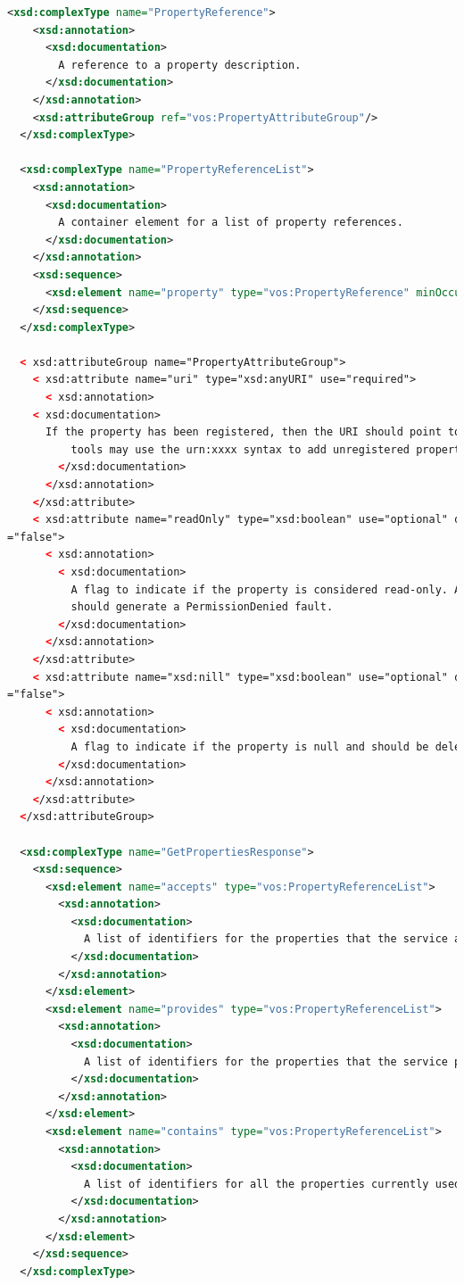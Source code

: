 \documentclass[11pt,a4paper]{ivoa}
\begin{document}
\begin{lstlisting}[language=xml, basicstyle=\scriptsize]
  <xsd:complexType name="PropertyReference">
    <xsd:annotation>
      <xsd:documentation>
        A reference to a property description.
      </xsd:documentation>
    </xsd:annotation>
    <xsd:attributeGroup ref="vos:PropertyAttributeGroup"/>
  </xsd:complexType>

  <xsd:complexType name="PropertyReferenceList">
    <xsd:annotation>
      <xsd:documentation>
        A container element for a list of property references.
      </xsd:documentation>
    </xsd:annotation>
    <xsd:sequence>
      <xsd:element name="property" type="vos:PropertyReference" minOccurs="0" maxOccurs="unbounded" nillable="true"/>
    </xsd:sequence>
  </xsd:complexType>

  < xsd:attributeGroup name="PropertyAttributeGroup">
    < xsd:attribute name="uri" type="xsd:anyURI" use="required">
      < xsd:annotation>
	< xsd:documentation>                    
	  If the property has been registered, then the URI should point to the registration document. Third party 
          tools may use the urn:xxxx syntax to add unregistered properties.
        </xsd:documentation>
      </xsd:annotation>
    </xsd:attribute>
    < xsd:attribute name="readOnly" type="xsd:boolean" use="optional" default
="false">
      < xsd:annotation>
        < xsd:documentation>
          A flag to indicate if the property is considered read-only. Attempting to modify a read-only property
          should generate a PermissionDenied fault.
        </xsd:documentation>
      </xsd:annotation>
    </xsd:attribute>
    < xsd:attribute name="xsd:nill" type="xsd:boolean" use="optional" default
="false">
      < xsd:annotation>
        < xsd:documentation>
          A flag to indicate if the property is null and should be deleted.
        </xsd:documentation>
      </xsd:annotation>
    </xsd:attribute>
  </xsd:attributeGroup>

  <xsd:complexType name="GetPropertiesResponse">
    <xsd:sequence>
      <xsd:element name="accepts" type="vos:PropertyReferenceList">
        <xsd:annotation>
          <xsd:documentation>
            A list of identifiers for the properties that the service accepts and understands.
          </xsd:documentation>
        </xsd:annotation>
      </xsd:element>
      <xsd:element name="provides" type="vos:PropertyReferenceList">
        <xsd:annotation>
          <xsd:documentation>
            A list of identifiers for the properties that the service provides.
          </xsd:documentation>
        </xsd:annotation>
      </xsd:element>
      <xsd:element name="contains" type="vos:PropertyReferenceList">
        <xsd:annotation>
          <xsd:documentation>
            A list of identifiers for all the properties currently used by nodes within the service.
          </xsd:documentation>
        </xsd:annotation>
      </xsd:element>
    </xsd:sequence>
  </xsd:complexType>


\end{lstlisting}
\end{document}

